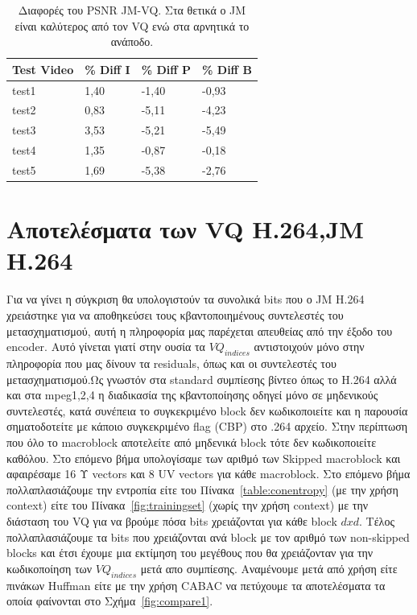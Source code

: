 \begin{table}[h!]
    \begin{center}
        \begin{tabular}{| l | l | l | l |}
        \hline
        Test Video & \% Diff I  & \% Diff P & \% Diff B   \\ \hline
        test1      & 1,40	    & -1,40	    & -0,93       \\ \hline
        test2      & 0,83	    & -5,11	    & -4,23       \\ \hline
        test3      & 3,53	    & -5,21	    & -5,49       \\ \hline
        test4      & 1,35	    & -0,87	    & -0,18       \\ \hline
        test5      & 1,69	    & -5,38	    & -2,76       \\ \hline
        \hline
        \end{tabular}
    \end{center}

    \caption{Διαφορές του PSNR JM-VQ. Στα θετικά ο JM είναι καλύτερος από τον VQ ενώ στα αρνητικά το ανάποδο.}
    \label{table:jmvqdiff}
\end{table}

\newpage
\section{Αποτελέσματα των VQ H.264,JM H.264}
\label{section:sect63}

\indent Για να γίνει η σύγκριση θα υπολογιστούν τα συνολικά bits που ο JM H.264 χρειάστηκε για να αποθηκεύσει τους κβαντοποιημένους συντελεστές του μετασχηματισμού, αυτή η πληροφορία μας παρέχεται απευθείας από την έξοδο του encoder. Αυτό γίνεται γιατί στην ουσία τα $VQ_{indices}$ αντιστοιχούν μόνο στην πληροφορία που μας δίνουν τα residuals, όπως και οι συντελεστές του μετασχηματισμού.Ως γνωστόν στα standard συμπίεσης βίντεο όπως το H.264 αλλά και στα mpeg1,2,4 η διαδικασία της κβαντοποίησης οδηγεί μόνο σε μηδενικούς συντελεστές, κατά συνέπεια το συγκεκριμένο block δεν κωδικοποιείτε και η παρουσία σηματοδοτείτε με κάποιο συγκεκριμένο flag (CBP) στο .264 αρχείο. Στην περίπτωση που όλο το macroblock αποτελείτε από μηδενικά block τότε δεν κωδικοποιείτε καθόλου. Στο επόμενο βήμα υπολογίσαμε των αριθμό των Skipped macroblock και αφαιρέσαμε 16 Υ vectors και 8 UV vectors για κάθε macroblock. Στο επόμενο βήμα πολλαπλασιάζουμε την εντροπία είτε του Πίνακα~\ref{table:conentropy} (με την χρήση context) είτε του Πίνακα~\ref{fig:trainingset} (χωρίς την χρήση context) με την διάσταση του VQ για να βρούμε πόσα bits χρειάζονται για κάθε block $dxd$. Τέλος πολλαπλασιάζουμε τα bits που χρειάζονται ανά block με τον αριθμό των non-skipped blocks και έτσι έχουμε μια εκτίμηση του μεγέθους που θα χρειάζονταν για την κωδικοποίηση των $VQ_{indices}$ μετά απο συμπίεσης. Αναμένουμε μετά από χρήση είτε πινάκων Huffman είτε με την χρήση CABAC να πετύχουμε τα αποτελέσματα τα οποία φαίνονται στο Σχήμα~\ref{fig:compare1}.

